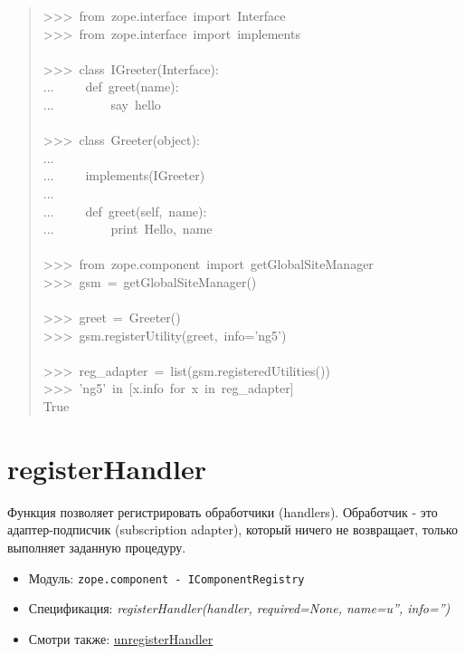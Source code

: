 \documentclass[14pt,a4paper,openany,twoside,final]{extbook}
\providecommand*{\DUroletitlereference}[1]{\textsl{#1}}
\begin{document}
\begin{quote}{\ttfamily \raggedright \noindent
>{}>{}>~from~zope.interface~import~Interface\\
>{}>{}>~from~zope.interface~import~implements\\
~\\
>{}>{}>~class~IGreeter(Interface):\\
...~~~~~def~greet(name):\\
...~~~~~~~~~\textquotedbl{}say~hello\textquotedbl{}\\
~\\
>{}>{}>~class~Greeter(object):\\
...\\
...~~~~~implements(IGreeter)\\
...\\
...~~~~~def~greet(self,~name):\\
...~~~~~~~~~print~\textquotedbl{}Hello\textquotedbl{},~name\\
~\\
>{}>{}>~from~zope.component~import~getGlobalSiteManager\\
>{}>{}>~gsm~=~getGlobalSiteManager()\\
~\\
>{}>{}>~greet~=~Greeter()\\
>{}>{}>~gsm.registerUtility(greet,~info='ng5')\\
~\\
>{}>{}>~reg\_adapter~=~list(gsm.registeredUtilities())\\
>{}>{}>~'ng5'~in~{[}x.info~for~x~in~reg\_adapter{]}\\
True
}
\end{quote}


\section*{registerHandler%
  \label{registerhandler}%
}

Функция позволяет регистрировать обработчики (handlers). Обработчик -
это адаптер-подписчик (subscription adapter), который ничего не
возвращает, только выполняет заданную процедуру.

\begin{itemize}

\item Модуль: \texttt{zope.component - IComponentRegistry}

\item Спецификация: \DUroletitlereference{registerHandler(handler, required=None, name=u'', info='')}

\item Смотри также: \hyperref[unregisterhandler]{unregisterHandler}

\end{itemize}
\end{document}
